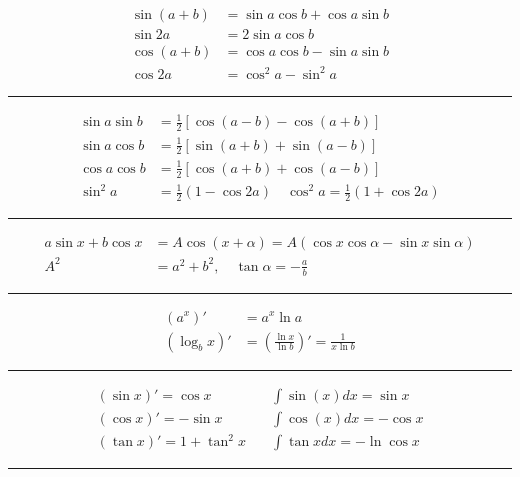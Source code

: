 \documentclass{article}
\begin{document}
\begin{multicols}{2}

\begin{align*}
  \sin(a+b) &=  \sin a \cos b + \cos a \sin b \\
  \sin 2a &= 2 \sin a \cos b \\
  \cos(a+b) &= \cos a \cos b - \sin a \sin b \\
  \cos 2a &= \cos^2 a - \sin^2 a
\end{align*}

\hrule

\vspace*{0mm}

\begin{align*}
  \sin a \sin b &= \frac{1}{2} \left[ \cos(a-b)  - \cos(a + b) \right] \\
  \sin a \cos b &= \frac{1}{2} \left[ \sin(a+b)  + \sin(a - b) \right] \\
  \cos a \cos b &= \frac{1}{2} \left[ \cos(a+b)  + \cos(a - b) \right] \\
  \sin^2 a &= \frac{1}{2} \left(1 - \cos 2a \right) \quad \cos^2 a = \frac{1}{2} \left( 1 + \cos 2a \right)
\end{align*}

\hrule

\begin{align*}
  a \sin x + b \cos x & = A \cos(x + \alpha) = A \left( \cos x \cos \alpha - \sin x \sin \alpha \right) \\
  A^2 & = a^2 + b^2 , \quad \tan \alpha = - \frac{a}{b}
\end{align*}

\hrule

\begin{align*}
  (a^x)' & = a^x \ln a \\
  (\log_b x)' &= \left( \frac{\ln x}{\ln b} \right)' = \frac{1}{x \ln b}
\end{align*}

\hrule

\begin{align*}
  (\sin x)' = \cos x & \quad \int \sin(x) dx = \sin x \\
  (\cos x)' = -\sin x & \quad \int \cos(x) dx = - \cos x \\
  (\tan x)' = 1 + \tan^2 x & \quad \int \tan x dx  = - \ln \cos x
\end{align*}

\hrule

\vspace*{2mm}


\end{multicols}
\end{document}
